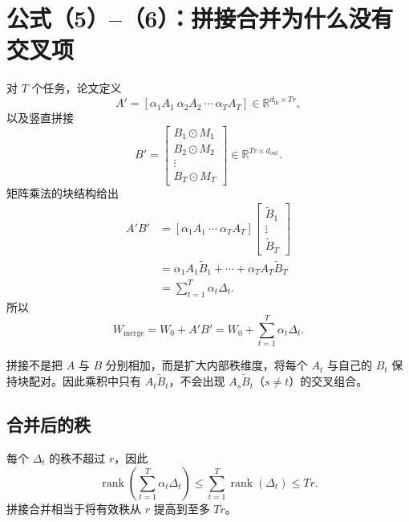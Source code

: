 \documentclass[UTF8,12pt,a4paper,fontset=none]{ctexart}
\numberwithin{equation}{section}
\newcommand{\R}{\mathbb{R}}
\newcommand{\rank}{\operatorname{rank}}
\begin{document}
\section{公式（5）--（6）：拼接合并为什么没有交叉项}

对 $T$ 个任务，论文定义
\begin{equation}
  A'=[\alpha_1A_1\ \alpha_2A_2\ \cdots\ \alpha_TA_T]
  \in\R^{d_{\mathrm{in}}\times Tr},
\end{equation}
以及竖直拼接
\begin{equation}
  B'=\begin{bmatrix}
  B_1\odot M_1\\
  B_2\odot M_2\\
  \vdots\\
  B_T\odot M_T
  \end{bmatrix}
  \in\R^{Tr\times d_{\mathrm{out}}}.
  \tag{5}
  \label{eq:paper5}
\end{equation}
矩阵乘法的块结构给出
\begin{align}
  A'B'
  &=[\alpha_1A_1\ \cdots\ \alpha_TA_T]
  \begin{bmatrix}
  \widetilde B_1\\ \vdots\\ \widetilde B_T
  \end{bmatrix}\\
  &=\alpha_1A_1\widetilde B_1+
  \cdots+\alpha_TA_T\widetilde B_T\\
  &=\sum_{t=1}^{T}\alpha_t\Delta_t.
\end{align}
所以
\begin{equation}
  W_{\mathrm{merge}}
  =W_0+A'B'
  =W_0+\sum_{t=1}^{T}\alpha_t\Delta_t.
  \tag{6}
  \label{eq:paper6}
\end{equation}

\begin{keybox}[关键点]
拼接不是把 $A$ 与 $B$ 分别相加，而是扩大内部秩维度，将每个 $A_t$ 与自己的 $B_t$ 保持块配对。因此乘积中只有 $A_t\widetilde B_t$，不会出现 $A_s\widetilde B_t$（$s\neq t$）的交叉组合。
\end{keybox}

\subsection{合并后的秩}

每个 $\Delta_t$ 的秩不超过 $r$，因此
\begin{equation}
  \rank\left(\sum_{t=1}^{T}\alpha_t\Delta_t\right)
  \le \sum_{t=1}^{T}\rank(\Delta_t)
  \le Tr.
\end{equation}
拼接合并相当于将有效秩从 $r$ 提高到至多 $Tr$。
\end{document}
